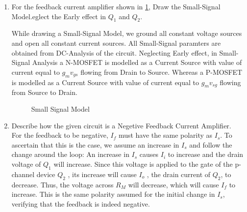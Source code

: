 \begin{enumerate}[label=\thesubsection.\arabic*.,ref=\thesubsection.\theenumi]

\item For the feedback current amplifier shown in \ref{fig:Input}, Draw the Small-Signal Model.eglect the Early effect in $Q_{1}$ and $Q_{2}$.\\
\begin{figure}[h!]
	\begin{center}
		\resizebox{\columnwidth/1}{!}{}
	\end{center}
	\caption{}
	\label{fig:Input}
\end{figure}

\solution
While drawing a Small-Signal Model, we ground all constant voltage sources and open all constant current sources. All Small-Signal paramters are obtained from DC-Analysis of the circuit. Neglecting Early effect, in Small-Signal Analysis a N-MOSFET is modelled as a Current Source with value of current equal to $g_{m}v_{gs}$ flowing from Drain to Source. Whereas a P-MOSFET is modelled as a Current Source with value of current equal to $g_{m}v_{sg}$ flowing from Source to Drain.
\begin{figure}[h!]
	\begin{center}
		\resizebox{\columnwidth/1}{!}{}
	\end{center}
	\caption{Small Signal Model}
	\label{fig:Small_Signal}
\end{figure}


\item Describe how the given circuit is a Negetive Feedback Current Amplifier.\\
\solution 
For the feedback to be negative, $I_{f}$ must have the same polarity as $I_{s}$. To ascertain that this is the case, we assume an increase in $I_{s}$ and follow the change around the loop: An increase in $I_{s}$ causes $I_{i}$ to increase and the drain voltage of $Q_{1}$ will increase. Since this voltage is applied to the gate of the p-channel device $Q_{2}$ , its increase will cause $I_{o}$ , the drain current of $Q_{2}$, to decrease. Thus, the voltage across $R_{M}$ will decrease, which will cause $I_{f}$ to increase. This is the same polarity assumed for the initial change in $I_{s}$, verifying that the feedback is indeed negative.\\


\end{enumerate}
